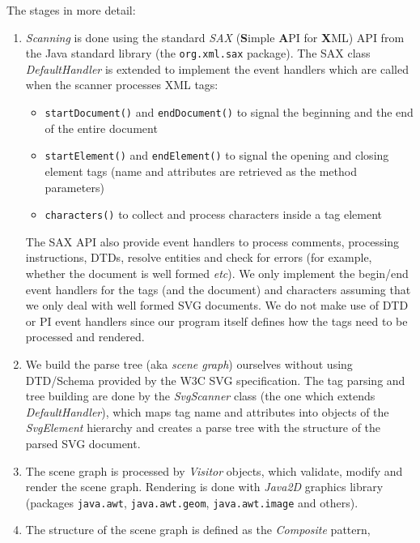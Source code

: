 \documentclass[a4paper]{article}
\begin{document}
The stages in more detail:

\begin{enumerate}
        \item \emph{Scanning} is done using the standard \emph{SAX} (\textbf{S}imple \textbf{A}PI 
        for \textbf{X}ML) API from the Java standard library (the \texttt{org.xml.sax} package). 
        The SAX class \emph{DefaultHandler} is extended to implement the event handlers which
        are called when the scanner processes XML tags:
        \begin{itemize}
                \item \verb!startDocument()! and \verb!endDocument()! to signal the beginning and the
                end of the entire document
                \item \verb!startElement()! and \verb!endElement()! to signal the opening and closing 
                element tags (name and attributes are retrieved as the method parameters)
                \item \verb!characters()! to collect and process characters inside a tag element
        \end{itemize}
        The SAX API also provide event handlers to process comments, processing instructions,
        DTDs, resolve entities and check for errors (for example, whether the document is well formed
        \emph{etc}). We only implement the begin/end event handlers for the tags (and the document)
        and characters assuming that we only deal with well formed SVG documents. We do not make
        use of DTD or PI event handlers since our program itself defines how the tags need to be
        processed and rendered.
        \item We build the parse tree (aka \emph{scene graph}) ourselves without using DTD/Schema
        provided by the \textsf{W3C SVG} specification. The tag parsing and tree building
        are done by the \emph{SvgScanner} class (the one which extends \emph{DefaultHandler}), 
        which maps tag name and attributes into objects of the \emph{SvgElement} hierarchy and creates 
        a parse tree with the structure of the parsed SVG document.
        \item The scene graph is processed by \emph{Visitor} objects, which validate, modify
        and render the scene graph. Rendering is done with \emph{Java2D} graphics library
        (packages \verb!java.awt!, \verb!java.awt.geom!, \verb!java.awt.image! and others).
        \item The structure of the scene graph is defined as the \emph{Composite} pattern,

\end{enumerate}
\end{document}
